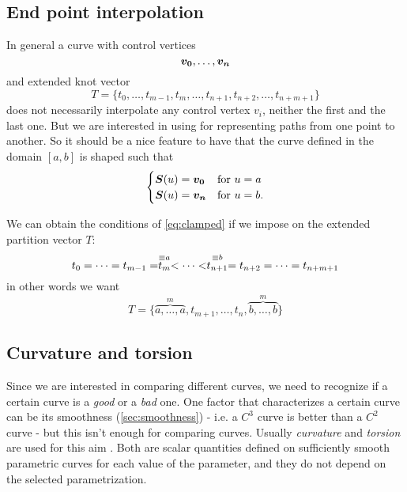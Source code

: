 \documentclass[dissertation.tex]{subfiles}
\begin{document}
\subsection{End point interpolation}\label{sec:clamped}
In general a \bs curve with control vertices
\begin{equation*}
  \boldsymbol{v_0}, \dots, \boldsymbol{v_n}
\end{equation*}
and extended knot vector
\begin{equation*}
  T=\{t_0,\dots,t_{m-1},t_{m},\dots,t_{n+1},t_{n+2},\dots,t_{n+m+1}\}
\end{equation*}
does not necessarily interpolate any control vertex $v_i$, neither the
first and the last one. But we are
interested in using \bs for representing paths from one point to
another. So it should be a nice feature to have that the curve defined in
the domain $[a,b]$ is shaped such that
\begin{equation}\label{eq:clamped}
  \begin{cases}
    \boldsymbol{S}(u)=\boldsymbol{v_0}& \text{for } u=a\\
    \boldsymbol{S}(u)=\boldsymbol{v_n}& \text{for } u=b.
  \end{cases}
\end{equation}

We can obtain \cite{deboor} the conditions of \cref{eq:clamped} if we impose on the
extended partition vector $T$:
\begin{equation*}
  t_0=\dots= t_{m-1}= \stackrel{\equiv a}{t_{m}}<\dots<
\stackrel{\equiv b}{t_{n+1}}= t_{n+2}=\dots= t_{n+m+1}
\end{equation*}
in other words we want
\begin{equation*}
  T=\{\overbrace{a,\dots,a}^m,t_{m+1},\dots,t_{n},\overbrace{b,\dots,b}^m\}
\end{equation*}

\subsection{Curvature and torsion}
Since we are interested in comparing different curves,
we need to recognize if a certain curve is a \emph{good} or a
\emph{bad} one. One factor that characterizes a certain curve can 
be its smoothness (\cref{sec:smoothness}) - i.e. a $C^3$ curve
is better than a $C^2$ curve - but this isn't
enough for comparing curves. Usually
\emph{curvature} and 
\emph{torsion} are used for this aim
\cite{docarmo}\cite{salomon}. Both are scalar quantities defined on
sufficiently smooth 
parametric curves for each value of the parameter, and they do not
depend on the selected parametrization.
\end{document}
